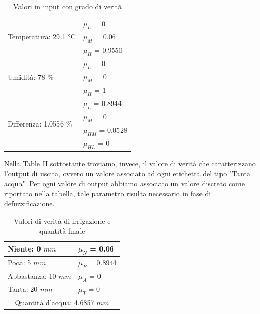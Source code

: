 \documentclass[conference,10pt]{IEEEtran}
\begin{document}
\begin{table}[ht]
	\centering
	\caption{Valori in input con grado di verità}
	{\renewcommand\arraystretch{1.7}
	\begin{tabular}{|l|l|}\hline
		\multirow{3}{*}{Temperatura: 29.1 °C}  & $\mu_{L}$ = 0 \\ \cline{2-2} &  $\mu_{M}$ = 0.06 \\ \cline{2-2}  &  $\mu_{H}$ = 0.9550 \\ \cline{2-2}
		\hline
		\multirow{3}{*}{Umidità: 78 $\%$}  & $\mu_{L}$ = 0 \\ \cline{2-2} &  $\mu_{M}$ = 0 \\ \cline{2-2}  &  $\mu_{H}$ = 1 \\ \cline{2-2}
		\hline
		\multirow{4}{*}{Differenza: 1.0556 $\%$}  & $\mu_{L}$ = 0.8944 \\ \cline{2-2} &  $\mu_{M}$ = 0 \\ \cline{2-2}  &  $\mu_{HM}$ = 0.0528 \\ \cline{2-2} &  $\mu_{HL}$ = 0 \\ \cline{2-2}
		\hline
	\end{tabular}}	
\end{table}
Nella Table II sottostante troviamo, invece, il valore di verità che caratterizzano l'output di uscita, ovvero un valore associato ad ogni etichetta del tipo "Tanta acqua".
Per ogni valore di output abbiamo associato un valore discreto come riportato nella tabella, tale parametro risulta necessario in fase di defuzzificazione.\\
\begin{table}[ht]
	\centering
	\caption{Valori di verità di irrigazione e quantità finale}
	{\renewcommand\arraystretch{1.7}
	\begin{tabular}{|l|l|}\hline
		Niente: 0 $mm$  & $\mu_{N}$ = 0.06 \\ \cline{2-2} 
		\hline
		Poca: 5 $mm$ & $\mu_{P}$ = 0.8944 \\ \cline{2-2} 
		\hline
		Abbastanza: 10 $mm$ & $\mu_{A}$ = 0 \\ \cline{2-2} 
		\hline
	    Tanta: 20 $mm$  & $\mu_{T}$ = 0  \\\cline{2-2} 
		\hline
		\multicolumn{2}{|c|}{Quantità d'acqua: 4.6857 $mm$} \\
		\hline		
	\end{tabular}}	
\end{table}



\end{document}
